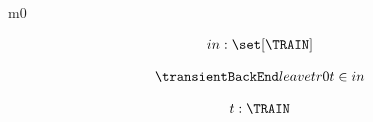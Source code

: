 \documentclass[12pt]{amsart}
\title{}
\author{}
\date{} %
\begin{document}
\maketitle
\tableofcontents


\begin{machine}{m0}


%
	\begin{align*}
\variable{		in : \set[\TRAIN]}
	\end{align*}
%



\begin{align*}
\transient{leave}{0}{tr0}
{t \in in}
\end{align*}

\begin{align*}
\dummy{	t : \TRAIN}
\end{align*}

\withsets{\TRAIN} 

\end{machine}
\end{document}
